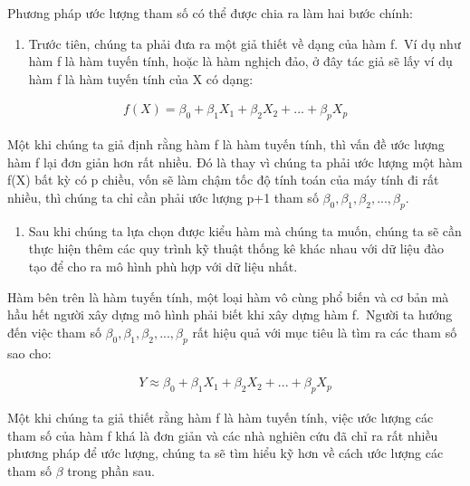 \documentclass[
]{article}
\providecommand{\tightlist}{%
  \setlength{\itemsep}{0pt}\setlength{\parskip}{0pt}}
\begin{document}
Phương pháp ước lượng tham số có thể được chia ra làm hai bước chính:

\begin{enumerate}
\def\labelenumi{\arabic{enumi}.}
\tightlist
\item
  Trước tiên, chúng ta phải đưa ra một giả thiết về dạng của hàm f.~Ví dụ như hàm f là hàm tuyến tính, hoặc là hàm nghịch đảo, ở đây tác giả sẽ lấy ví dụ hàm f là hàm tuyến tính của X có dạng:
\end{enumerate}

\begin{align}
f(X) = \beta_0 + \beta_1 X_1 + \beta_2 X_2 + ... + \beta_p X_p
\end{align}

Một khi chúng ta giả định rằng hàm f là hàm tuyến tính, thì vấn đề ước lượng hàm f lại đơn giản hơn rất nhiều. Đó là thay vì chúng ta phải ước lượng một hàm f(X) bất kỳ có p chiều, vốn sẽ làm chậm tốc độ tính toán của máy tính đi rất nhiều, thì chúng ta chỉ cần phải ước lượng p+1 tham số \(\beta_0, \beta_1, \beta_2, ... , \beta_p\).

\begin{enumerate}
\def\labelenumi{\arabic{enumi}.}
\setcounter{enumi}{1}
\tightlist
\item
  Sau khi chúng ta lựa chọn được kiểu hàm mà chúng ta muốn, chúng ta sẽ cần thực hiện thêm các quy trình kỹ thuật thống kê khác nhau với dữ liệu đào tạo để cho ra mô hình phù hợp với dữ liệu nhất.
\end{enumerate}

Hàm bên trên là hàm tuyến tính, một loại hàm vô cùng phổ biến và cơ bản mà hầu hết người xây dựng mô hình phải biết khi xây dựng hàm f.~Người ta hướng đến việc tham số \(\beta_0, \beta_1, \beta_2, ... , \beta_p\) rất hiệu quả với mục tiêu là tìm ra các tham số sao cho:

\begin{align}
Y \approx \beta_0 + \beta_1 X_1 + \beta_2 X_2 + ... + \beta_p X_p
\end{align}

Một khi chúng ta giả thiết rằng hàm f là hàm tuyến tính, việc ước lượng các tham số của hàm f khá là đơn giản và các nhà nghiên cứu đã chỉ ra rất nhiều phương pháp để ước lượng, chúng ta sẽ tìm hiểu kỹ hơn về cách ước lượng các tham số \(\beta\) trong phần sau.
\end{document}
